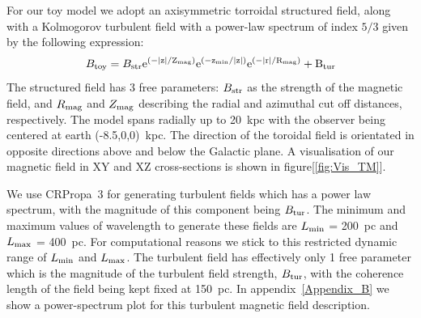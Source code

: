 \documentclass[usenatbib]{mnras}
\begin{document}
For our toy model we adopt an axisymmetric torroidal structured field, along with a Kolmogorov turbulent field with a power-law spectrum of index $5/3$ given by the following expression:
\begin{equation}\label{TM_equation}
B_{\rm{toy}}= B_{\rm{str}}\rm{e}^{{(-|z|}/Z_{\rm{mag}})} \rm{e}^{(-z_{\rm{min}}/|z|)}\rm{e}^{(-|r|/R_{\rm{mag}})} + B_{\rm{tur}}
\end{equation}
The structured field has 3 free parameters: $B_{\rm str}$ as the strength of the magnetic field, and $R_{\rm {mag}}$ and $Z_{\rm {mag}}$ describing the radial and azimuthal cut off distances, respectively. The model spans radially up to 20~kpc with the observer being centered at earth (-8.5,0,0)~kpc. The direction of the toroidal field is orientated in opposite directions above and below the Galactic plane. A visualisation of our magnetic field in XY and XZ cross-sections is shown in figure[\ref{fig:Vis_TM}]. 

We use CRPropa~3 \cite{CRPropa3_2016} for generating turbulent fields which has a power law spectrum, with the magnitude of this component being $B_{\rm{tur}}$. 
The minimum and maximum values of wavelength to generate these fields are  $L_{\rm min}$ = 200~pc and $L_{\rm max}$ = 400~pc. For computational reasons we stick to this restricted dynamic range of $L_{\rm min}$ and $L_{\rm max}$. The turbulent field has effectively only 1 free parameter which is the magnitude of the turbulent field strength, $ B_{\rm tur}$, with the coherence length of the field being kept fixed at 150~pc.  In appendix~\ref{Appendix_B} we show a power-spectrum plot for this turbulent magnetic field description.
\end{document}
